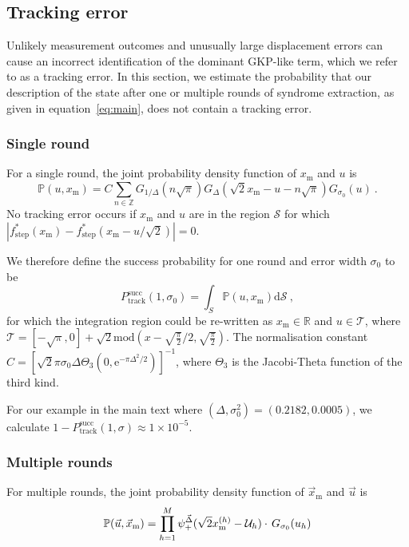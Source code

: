 \documentclass[prx,reprint,superscriptaddress,longbibliography,floatfix,nofootinbib]{revtex4-1}
\begin{document}
\subsection{Tracking error}
Unlikely measurement outcomes and unusually large displacement errors can cause an incorrect identification of the dominant GKP-like term, which we refer to as a tracking error. In this section, we estimate the probability that our description of the state after one or multiple rounds of syndrome extraction, as given in equation~\ref{eq:main}, does not contain a tracking error.

\subsubsection{Single round}
For a single round, the joint probability density function of $x_\text{m}$ and $u$ is
\begin{equation}
    \mathbb{P}(u,x_\text{m}) = C\sum_{n\in\mathbb{Z}}G_{1/\Delta}(n\sqrt{\pi})G_{\Delta}(\sqrt{2}x_\text{m}-u-n\sqrt{\pi}) G_{\sigma_0}(u) \ .
\end{equation}
No tracking error occurs if $x_\text{m}$ and $u$ are in the region $\mathcal{S}$ for which $|f_\text{step}^{*}(x_\text{m}) - f_\text{step}^{*}(x_\text{m}-u/\sqrt{2})| = 0$.

We therefore define the success probability for one round and error width $\sigma_0$ to be
\begin{equation}
    P^{\text{succ}}_{\text{track}}(1,\sigma_0) = \int_{S}  \mathbb{P}(u,x_\text{m}) \text{d}\mathcal{S} \ ,
\end{equation}
for which the integration region could be re-written as $x_\text{m}\in\mathbb{R}$ and $u\in\mathcal{T}$, where 
 $\mathcal{T} = [-\sqrt{\pi},0]+\sqrt{2}\text{mod}(x-\sqrt{\frac{\pi}{2}}/2,\sqrt{\frac{\pi}{2}})$. The normalisation constant $C = [\sqrt{2}\pi\sigma_0\Delta\Theta_3(0,\text{e}^{-\pi\Delta^2/2})]^{-1}$, where $\Theta_3$ is the Jacobi-Theta function of the third kind. 
 
 For our example in the main text where $(\Delta,\sigma_0^2) = (0.2182,0.0005)$, we calculate $1-P^{\text{succ}}_{\text{track}}(1,\sigma) \approx 1\times10^{-5}$.
\subsubsection{Multiple rounds}
For multiple rounds, the joint probability density function of $\vec{x}_{\text{m}}$ and $\vec{u}$ is 
\begin{equation}
    \mathbb{P}(\vec{u},\vec{x}_\text{m}) = \prod_{h=1}^{M}\psi^{\vec{\Delta}}_{+}(\sqrt{2}x^{(h)}_{\text{m}}-\mathcal{U}_h) \cdot \hspace{0.05cm} G_{\sigma_0}(u_h)
    \label{eq:pdf_joint_multi}
\end{equation}
\end{document}
